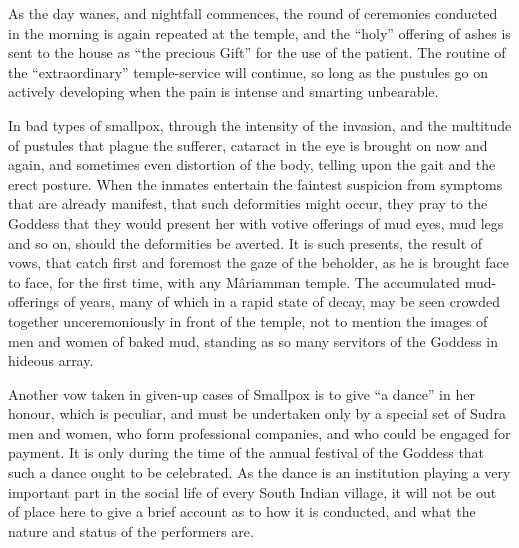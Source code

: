 \documentclass[a4paper, 12pt, oneside, english]{article}
\begin{document}
As the day wanes, and nightfall commences, the round of ceremonies conducted in the morning is again repeated at the temple, and the ``holy'' offering of ashes is sent to the house as ``the precious Gift'' for the use of the patient. The routine of the ``extraordinary'' temple-service will continue, so long as the pustules go on actively developing when the pain is intense and smarting unbearable.

In bad types of smallpox, through the intensity of the invasion, and the multitude of pustules that plague the sufferer, cataract in the eye is brought on now and again, and sometimes even distortion of the body, telling upon the gait and the erect posture. When the inmates entertain the faintest suspicion from symptoms that are already manifest, that such deformities might occur, they pray to the Goddess that they would present her with votive offerings of mud eyes, mud legs and so on, should the deformities be averted. It is such presents, the result of vows, that catch first and foremost the gaze of the beholder, as he is brought face to face, for the first time, with any Mâriamman temple. The accumulated mud-offerings of years, many of which in a rapid state of decay, may be seen crowded together unceremoniously in front of the temple, not to mention the images of men and women of baked mud, standing as so many servitors of the Goddess in hideous array.

Another vow taken in given-up cases of Smallpox is to give ``a dance'' in her honour, which is peculiar, and must be undertaken only by a special set of Sudra men and women, who form professional companies, and who could be engaged for payment. It is only during the time of the annual festival of the Goddess that such a dance ought to be celebrated. As the dance is an institution playing a very important part in the social life of every South Indian village, it will not be out of place here to give a brief account as to how it is conducted, and what the nature and status of the performers are.
\end{document}
